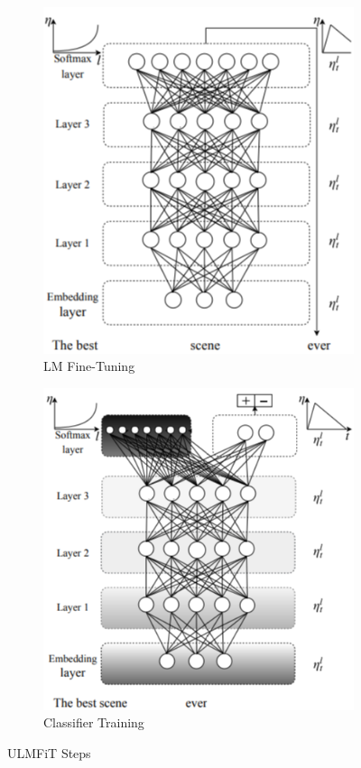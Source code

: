 \begin{figure}
\begin{subfigure}[b]{0.3\textwidth}
         \includegraphics[width=\textwidth]{images/ulm2.png}
         \caption{LM Fine-Tuning}
         \label{fig:lm_ft}
     \end{subfigure}
     \begin{subfigure}[b]{0.3\textwidth}
         \centering
         \includegraphics[width=\textwidth]{images/ulm3.png}
         \caption{Classifier Training}
         \label{fig:lm_classif}
     \end{subfigure}
        \caption{ULMFiT Steps \cite{howard2018universal}}
        \label{fig:ulmfit_steps}
\end{figure}


